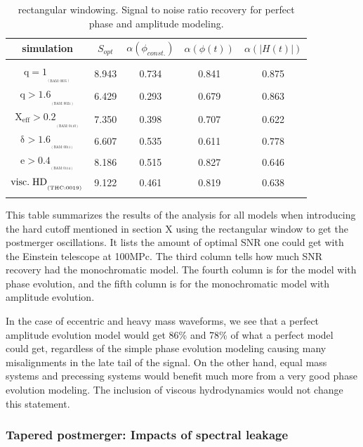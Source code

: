 \begin{table}[!htbp]
\begin{center}

\begin{tabular}{ccccc}

simulation&$S_{opt}$&$\alpha(\phi_{const.})$&$\alpha(\phi(t))$&$\alpha(|H(t)|)$\\ 
\hline\\ 
$\mathrm{{q=1}_{_{_{(BAM:0035)}}}}$&8.943&0.734&0.841&0.875\\  
$\mathrm{{q>1.6}_{_{_{(BAM:0021)}}}}$&6.429&0.293&0.679&0.863\\  
$\mathrm{{X_{eff}>0.2}_{_{_{(BAM:0110)}}}}$&7.350&0.398&0.707&0.622\\  
$\mathrm{{\delta>1.6}_{_{_{(BAM:0011)}}}}$&6.607&0.535&0.611&0.778\\  
$\mathrm{{e>0.4}_{_{_{(BAM:0114)}}}}$&8.186&0.515&0.827&0.646\\  
$\mathrm{{visc.\hspace{1mm} HD}_{_{_{(THC:0019)}}}}$&9.122&0.461&0.819&0.638\\  
\hline\\ 

\end{tabular}
\end{center}
\caption{rectangular windowing. Signal to noise ratio recovery for perfect phase and amplitude modeling.}
This table summarizes the results of the analysis for all models when introducing the hard cutoff mentioned in section X using the rectangular window to get the postmerger oscillations. It lists the amount of optimal SNR one could get with the Einstein telescope at 100MPc. The third column tells how much SNR recovery had the monochromatic model. The fourth column is for the model with phase evolution, and the fifth column is for the monochromatic model with amplitude evolution.
\label{table untapered}
\end{table}
\FloatBarrier

In the case of eccentric and heavy mass waveforms, we see that a perfect amplitude evolution model would get 86\%  and 78\% of what a perfect model could get, regardless of the simple phase evolution modeling causing many misalignments in the late tail of the signal. On the other hand, equal mass systems and precessing systems would benefit much more from a very good phase evolution modeling. The inclusion of viscous hydrodynamics would not change this statement.

\subsubsection*{Tapered postmerger: Impacts of spectral leakage}

